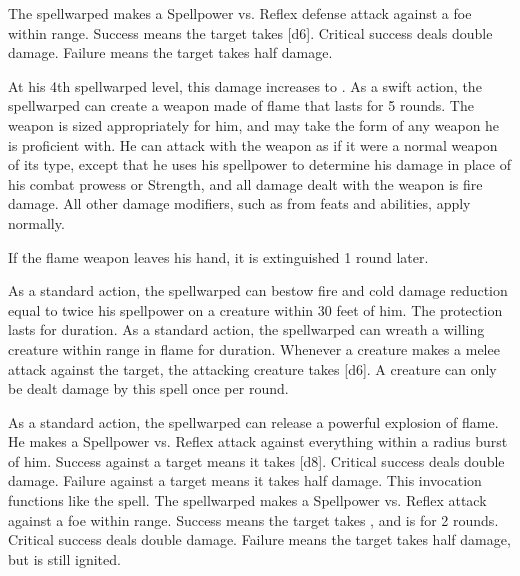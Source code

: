             The spellwarped makes a Spellpower vs. Reflex defense attack against a foe within \rngmed range.
            Success means the target takes [d6].
            Critical success deals double damage.
            Failure means the target takes half damage.
            \par At his 4th spellwarped level, this damage increases to .
            As a swift action, the spellwarped can create a weapon made of flame that lasts for 5 rounds.
            The weapon is sized appropriately for him, and may take the form of any weapon he is proficient with.
            He can attack with the weapon as if it were a normal weapon of its type, except that he uses his spellpower to determine his damage in place of his combat prowess or Strength, and all damage dealt with the weapon is fire damage.
            All other damage modifiers, such as from feats and abilities, apply normally.
            \par If the flame weapon leaves his hand, it is extinguished 1 round later.

            As a standard action, the spellwarped can bestow fire and cold damage reduction equal to twice his spellpower on a creature within 30 feet of him.
            The protection lasts for \durshort duration.
            As a standard action, the spellwarped can wreath a willing creature within \rngclose range in flame for \durshort duration.
            Whenever a creature makes a melee attack against the target, the attacking creature takes [d6].
            A creature can only be dealt damage by this spell once per round.

            As a standard action, the spellwarped can release a powerful explosion of flame.
            He makes a Spellpower vs. Reflex attack against everything within a \areamed radius burst of him.
            Success against a target means it takes [d8].
            Critical success deals double damage.
            Failure against a target means it takes half damage.
            This invocation functions like the  spell.
            The spellwarped makes a Spellpower vs. Reflex attack against a foe within \rngclose range.
            Success means the target takes , and is \ignited for 2 rounds.
            Critical success deals double damage.
            Failure means the target takes half damage, but is still ignited.

